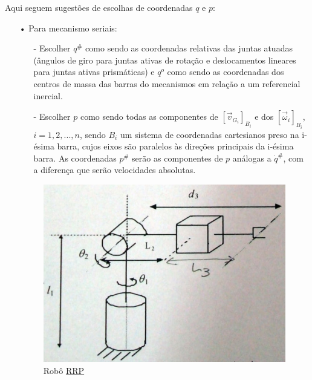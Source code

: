 \documentclass[12pt,a4paper]{article}
\begin{document}
Aqui seguem sugestões de escolhas de coordenadas $q$ e $p$:
\begin{itemize}
\item[•] Para mecanismo seriais:
	\begin{itemize}
	\item[-] Escolher $q^{\#}$ como sendo as coordenadas relativas das juntas atuadas (ângulos de giro para juntas ativas de rotação e deslocamentos lineares para juntas ativas prismáticas) e $q^o$ como sendo as coordenadas dos centros de massa das barras do mecanismos em relação a um referencial inercial.
	
	\item[-] Escolher $p$ como sendo todas as componentes de $[\vec{v}_{G_i}]_{B_i}$ e dos $[\vec{\omega}_i]_{B_i}$, $i = 1, 2, ..., n$, sendo $B_i$ um sistema de coordenadas cartesianos preso na i-ésima barra, cujos eixos são paralelos às direções principais da i-ésima barra.
As coordenadas $p^{\#}$ serão as componentes de $p$ análogas a $\dot{q}^{\#}$, com a diferença que serão velocidades absolutas.

	\end{itemize}



\begin{figure}[h!]
	\centering
	\includegraphics[scale=0.4]{RRP.png}  
	\caption{Robô \underline{R}\underline{R}\underline{P}}
	\label{fig:figura1}
\end{figure}

\begin{itemize}


\end{itemize}
\end{itemize}
\end{document}
